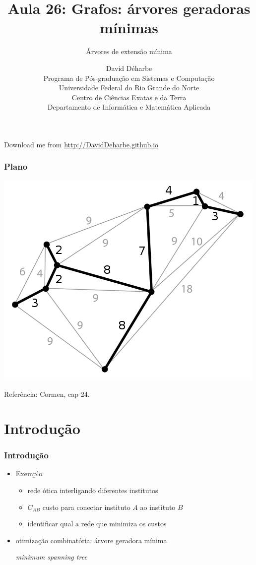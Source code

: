 \documentclass{beamer}
\title{Aula 26: Grafos: árvores geradoras mínimas}
\subtitle{Árvores de extensão mínima}
\author{David Déharbe \\
  Programa de Pós-graduação em Sistemas e Computação \\
  Universidade Federal do Rio Grande do Norte \\
  Centro de Ciências Exatas e da Terra \\
  Departamento de Informática e Matemática Aplicada}
\date{}
\begin{document}

\begin{frame}
  \titlepage

  Download me from \url{http://DavidDeharbe.github.io}
\end{frame}

\begin{frame}
  \frametitle{Plano}
\begin{center}
\includegraphics[height=.5\textheight]{fig/minimum_spanning_tree.png}
\end{center}
  \tableofcontents
Referência: Cormen, cap 24.
\end{frame}

\section{Introdução}

\begin{frame}
\frametitle{Introdução}

\begin{itemize}
\item Exemplo
\begin{itemize}
\item rede ótica interligando diferentes institutos
\item $C_{AB}$ custo para conectar instituto $A$ ao instituto $B$
\item identificar qual a rede que minimiza os custos
\end{itemize}
\item \alert{otimização combinatória}: árvore geradora mínima 

\textit{minimum spanning tree}
\end{itemize}

\end{frame}
\end{document}
